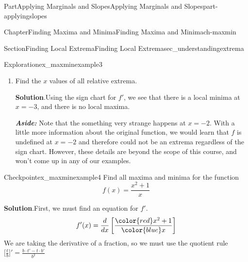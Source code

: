\documentclass{tufte-book}
\newcommand{\blocktitlefont}{\relax}
\newcommand{\alert}[1]{\textbf{\textit{#1}}}
\numberwithin{equation}{chapter}
\newcommand{\red}[1]{   {\color{red}   #1}   }
\newcommand{\blue}[1]{  {\color{blue}  #1}  }
\newcommand{\ddxfrac}[1]{ \dfrac{d}{dx} \left[ #1 \right]  }
\newcommand{\D}[1]{ \Big[ #1 \Big]'  }
\begin{document}
\begin{partptx}{Part}{Applying Marginals and Slopes}{}{Applying Marginals and Slopes}{}{}{part-applyingslopes}
\begin{chapterptx}{Chapter}{Finding Maxima and Minima}{}{Finding Maxima and Minima}{}{}{ch-maxmin}
\begin{sectionptx}{Section}{Finding Local Extrema}{}{Finding Local Extrema}{}{}{sec_understandingextrema}
\begin{exploration}{Exploration}{}{ex_maxminexample3}
\begin{enumerate}[font=\bfseries,label=(\alph*),ref=\alph*]
\begin{image}{0}{1}{0}{}
{
}%
\end{image}%
%
\par
Reading off of the sign chart for \(f'\), we see that the \emph{original} (mystery) function \(f\) is increasing on the intervals \((-3,2)\cup(2,\infty)\), and the \emph{original} (mystery) function \(f\) is decreasing on the interval \((-\infty,-3)\).%
\item{}Find the \(x\) values of all relative extrema.%
\par\smallskip%
\noindent\textbf{\blocktitlefont Solution}.\hypertarget{ex_maxminexample3-3-2}{}\quad{}Using the sign chart for \(f'\), we see that there is a local minima at \(x=-3\), and there is no local maxima.%
\par
\alert{Aside:} Note that the something very strange happens at \(x=-2\).  With a little more information about the original function, we would learn that \(f\) is undefined at \(x=-2\) and therefore could not be an extrema regardless of the sign chart.  However, these details are beyond the scope of this course, and won't come up in any of our examples.%
\end{enumerate}%
\end{exploration}%
\begin{inlineexercise}{Checkpoint}{}{ex_maxminexample4}%
Find all maxima and minima for the function%
\begin{equation*}
f(x) = \dfrac{x^2 + 1}{x}
\end{equation*}
%
\par\smallskip%
\noindent\textbf{\blocktitlefont Solution}.\hypertarget{ex_maxminexample4-2}{}\quad{}First, we must find an equation for \(f'\).%
\begin{equation*}
f'(x) = \ddxfrac{\dfrac{ \red{x^2 + 1} }{\blue{x}}} 
\end{equation*}
We are taking the derivative of a fraction, so we must use the quotient rule \(\D{\frac{t}{b}} = \frac{b\cdot t' - t\cdot b'}{b^2}\)%
\begin{align*}

\end{align*}
\end{inlineexercise}
\end{sectionptx}
\end{chapterptx}
\end{partptx}
\end{document}
